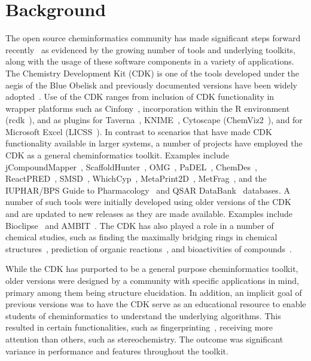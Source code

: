 \documentclass[10pt]{bmcart}
\begin{document}
\section*{Background}

The open source cheminformatics community has made significant steps
forward recently~\cite{OBoyle2011b} as evidenced by the growing number
of tools and underlying toolkits, along with the usage of these
software components in a variety of applications.
The Chemistry Development Kit (CDK) is one of the tools developed
under the aegis of the Blue Obelisk 
and previously documented versions have been widely adopted~\cite{Steinbeck2003,Steinbeck2006}.
Use of the CDK ranges from inclusion of CDK functionality in
wrapper platforms such as Cinfony~\cite{OBoyle2008}, incorporation
within the R environment (rcdk~\cite{Guha2007}), and as plugins for
Taverna~\cite{Truszkowski2011}, 
KNIME~\cite{Beisken2013}, Cytoscape (ChemViz2~\cite{ChemViz2}), and for
Microsoft Excel (LICSS~\cite{Lawson2012}).
In contrast to scenarios that have made CDK functionality available in
larger systems, a number of projects have employed the CDK as a
general cheminformatics toolkit. Examples include 
jCompoundMapper~\cite{Hinselmann2011}, ScaffoldHunter~\cite{wetzel2009interactive,Klein2013}, OMG~\cite{Peironcely2012},
PaDEL~\cite{yap2011padel}, ChemDes~\cite{Dong2015},
ReactPRED~\cite{ReactPRED}, SMSD~\cite{Rahman2009,Rahman2014,Rahman2016},
WhichCyp~\cite{Rostkowski2013}, MetaPrint2D~\cite{Carlsson2010}, MetFrag~\cite{Wolf2010},
and the IUPHAR/BPS Guide to Pharmacology~\cite{Southan2016} and
QSAR DataBank~\cite{Ruusmann2015} databases.
A number of such tools were initially developed using older versions
of the CDK and are updated to new releases as they are made
available. Examples include Bioclipse~\cite{spjuth2007bioclipse,
spjuth2009bioclipse} and
AMBIT~\cite{jeliazkova2011ambit,jeliazkova2011ambitsmarts,kochev2013ambit}. The
CDK has also played a role in a number of chemical studies, such as finding
the maximally bridging rings in chemical structures~\cite{Marth2015},
prediction of organic reactions~\cite{Segler2016}, and bioactivities
of compounds~\cite{Alvarsson2016}.

While the CDK has purported to be a general purpose cheminformatics
toolkit, older versions were designed by a community with specific
applications in mind, primary among them being structure elucidation. In
addition, an implicit goal of previous versions was to have the CDK
serve as an educational resource to enable students of cheminformatics
to understand the underlying algorithms. This resulted in certain
functionalities, such as fingerprinting~\cite{Clark2014,Cannon2006},
receiving more attention than others, such as stereochemistry. The
outcome was significant variance in performance and features
throughout the toolkit.
\end{document}
